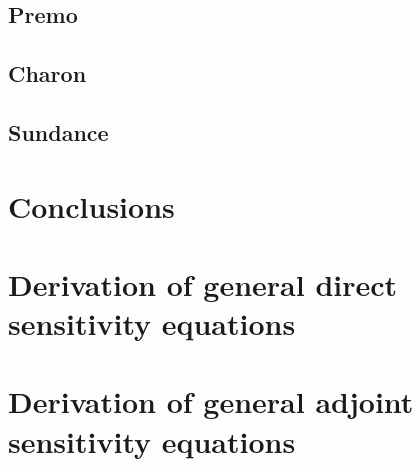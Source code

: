 \documentclass[pdf,ps2pdf,11pt]{SANDreport}
\begin{document}
\subsection{Premo}

\subsection{Charon}

\subsection{Sundance}

\section{Conclusions}

%
\clearpage



%
\appendix

\section{Derivation of general direct sensitivity equations}

\section{Derivation of general adjoint sensitivity equations}

\begin{SANDdistribution}
\end{SANDdistribution}
\end{document}
